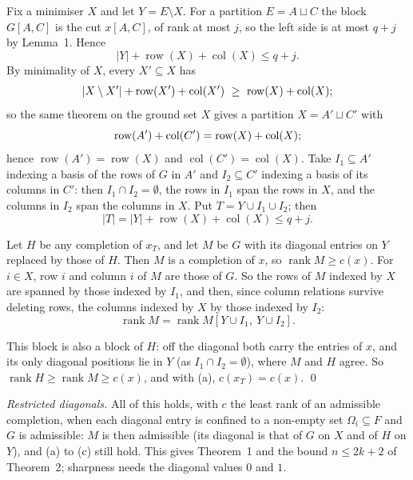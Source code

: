 \documentclass[11pt,letterpaper,reqno]{amsart}
\theoremstyle{spaced}
\begin{document}
\begingroup{} Fix a minimiser \(X\) and let \(Y = E \setminus X\). For a partition \(E = A \sqcup C\) the block \(G[A, C]\) is the cut \(x[A, C]\), of rank at most \(j\), so the left side is at most \(q + j\) by Lemma~1. Hence
\[\lvert Y\rvert + \operatorname{row}(X) + \operatorname{col}(X) \le q + j.\]
By minimality of \(X\), every \(X' \subseteq X\) has
\[\lvert X \setminus X'\rvert + \operatorname{row}(X') + \operatorname{col}(X') \ \ge\ \operatorname{row}(X) + \operatorname{col}(X);\postdisplaypenalty=10000 \]
so the same theorem on the ground set \(X\) gives a partition \(X = A' \sqcup C'\) with
\[\operatorname{row}(A') + \operatorname{col}(C') = \operatorname{row}(X) + \operatorname{col}(X);\postdisplaypenalty=10000 \]
hence \(\operatorname{row}(A') = \operatorname{row}(X)\) and \(\operatorname{col}(C') = \operatorname{col}(X)\). Take \(I_1 \subseteq A'\) indexing a basis of the rows of \(G\) in \(A'\) and \(I_2 \subseteq C'\) indexing a basis of its columns in \(C'\): then \(I_1 \cap I_2 = \emptyset\), the rows in \(I_1\) span the rows in \(X\), and the columns in \(I_2\) span the columns in \(X\). Put \(T = Y \cup I_1 \cup I_2\); then
\[\lvert T\rvert = \lvert Y\rvert + \operatorname{row}(X) + \operatorname{col}(X) \le q + j.\]\par\endgroup

\begingroup{} Let \(H\) be any completion of \(x_T\), and let \(M\) be \(G\) with its diagonal entries on \(Y\) replaced by those of \(H\). Then \(M\) is a completion of \(x\), so \(\operatorname{rank} M \ge c(x)\). For \(i \in X\), row \(i\) and column \(i\) of \(M\) are those of \(G\). So the rows of \(M\) indexed by \(X\) are spanned by those indexed by \(I_1\), and then, since column relations survive deleting rows, the columns indexed by \(X\) by those indexed by \(I_2\):
\[\operatorname{rank} M = \operatorname{rank} M[Y \cup I_1,\ Y \cup I_2].\]\par\endgroup

This block is also a block of \(H\): off the diagonal both carry the entries of \(x\), and its only diagonal positions lie in \(Y\) (as \(I_1 \cap I_2 = \emptyset\)), where \(M\) and \(H\) agree. So \(\operatorname{rank} H \ge \operatorname{rank} M \ge c(x)\), and with (a), \(c(x_T) = c(x)\). \qed

\emph{Restricted diagonals.} All of this holds, with \(c\) the least rank of an admissible completion, when each diagonal entry is confined to a non-empty set \(\Omega_i \subseteq F\) and \(G\) is admissible: \(M\) is then admissible (its diagonal is that of \(G\) on \(X\) and of \(H\) on \(Y\)), and (a) to (c) still hold. This gives Theorem~1 and the bound \(n \le 2k+2\) of Theorem~2; sharpness needs the diagonal values \(0\) and \(1\).
\end{document}
